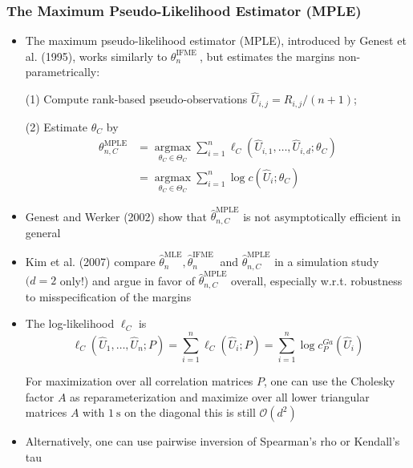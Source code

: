 \subsubsection*{The Maximum Pseudo-Likelihood Estimator (MPLE)}
\begin{itemize}[leftmargin=*]
    \item The maximum pseudo-likelihood estimator (MPLE), introduced by Genest et al. (1995), works similarly to $\theta_{n}^{\text {IFME }}$, but estimates the margins non-parametrically:
    
(1) Compute rank-based pseudo-observations $\hat{U}_{i, j}=R_{i, j} /(n+1)$; 

(2) Estimate $\theta_{C}$ by
$$
\begin{aligned}
\theta_{n, C}^{\mathrm{MPLE}}&=\underset{\theta_{C} \in \Theta_{C}}{\operatorname{argmax}} \sum_{i=1}^{n} \ell_{C}\left(\hat{U}_{i, 1}, \ldots, \hat{U}_{i, d} ; \theta_{C}\right)\\
&=\underset{\theta_{C} \in \Theta_{C}}{\operatorname{argmax}} \sum_{i=1}^{n} \log c\left(\hat{U}_{i} ; \theta_{C}\right)
\end{aligned}
$$
    \item Genest and Werker (2002) show that $\hat{\theta}_{n, C}^{\mathrm{MPLE}}$ is not asymptotically efficient in general
    \item Kim et al. (2007) compare $\hat{\theta}_{n}^{\mathrm{MLE}}, \hat{\theta}_{n}^{\text {IFME }}$ and $\hat{\theta}_{n, C}^{\mathrm{MPLE}}$ in a simulation study $(d=2$ only!) and argue in favor of $\hat{\theta}_{n, C}^{\mathrm{MPLE}}$ overall, especially w.r.t. robustness to misspecification of the margins
\end{itemize}



\begin{itemize}[leftmargin=*]
    \item The log-likelihood $\ell_{C}$ is
$$
\ell_{C}\left(\hat{U}_{1}, \ldots, \hat{U}_{n} ; P\right)=\sum_{i=1}^{n} \ell_{C}\left(\hat{U}_{i} ; P\right)=\sum_{i=1}^{n} \log c_{P}^{G a}\left(\hat{U}_{i}\right)
$$

For maximization over all correlation matrices $P$, one can use the Cholesky factor $A$ as reparameterization and maximize over all lower triangular matrices $A$ with $1 \mathrm{~s}$ on the diagonal this is still $\mathcal{O}\left(d^{2}\right)$
    \item Alternatively, one can use pairwise inversion of Spearman's rho or Kendall's tau
\end{itemize}

